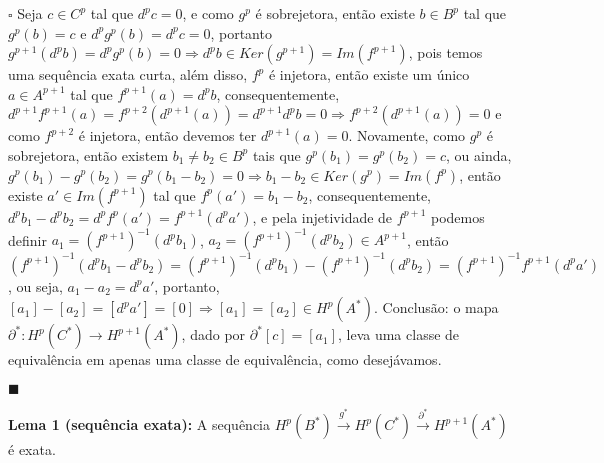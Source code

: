 \documentclass{article}
\begin{document}
	$\square$ Seja $c \in C^{p}$ tal que $d^{p}c=0$, e como $g^{p}$ é sobrejetora, então existe $b \in B^{p}$ tal que $g^{p}(b) = c$ e $d^{p}g^{p}(b) = d^{p}c = 0$, portanto $g^{p+1}(d^{p}b) = d^{p}g^{p}(b) = 0 \Rightarrow d^{p}b \in Ker(g^{p+1}) = Im(f^{p+1})$, pois temos uma sequência exata curta, além disso, $f^{p}$ é injetora, então existe um único $a \in A^{p+1}$ tal que $f^{p+1}(a) = d^{p}b$, consequentemente, $d^{p+1}f^{p+1}(a) = f^{p+2}(d^{p+1}(a))=d^{p+1}d^{p}b=0 \Rightarrow f^{p+2}(d^{p+1}(a)) =0$ e como $f^{p+2}$ é injetora, então devemos ter $d^{p+1}(a)=0$. Novamente, como $g^{p}$ é sobrejetora, então existem $b_{1} \neq b_{2} \in B^{p}$ tais que $g^{p}(b_{1}) = g^{p}(b_{2}) = c$, ou ainda, $g^{p}(b_{1}) - g^{p}(b_{2}) = g^{p}(b_{1}-b_{2}) = 0 \Rightarrow b_{1}-b_{2} \in Ker(g^{p}) = Im(f^{p})$, então existe $a' \in Im(f^{p+1})$ tal que $f^{p}(a') = b_{1}-b_{2}$, consequentemente, $d^{p}b_{1} - d^{p}b_{2} = d^{p}f^{p}(a') = f^{p+1}(d^{p}a')$, e pela injetividade de $f^{p+1}$ podemos definir $a_{1} = (f^{p+1})^{-1}(d^{p}b_{1})$, $ a_{2} = (f^{p+1})^{-1}(d^{p}b_{2}) \in A^{p+1}$, então $(f^{p+1})^{-1}(d^{p}b_{1} - d^{p}b_{2}) =(f^{p+1})^{-1}(d^{p}b_{1}) - (f^{p+1})^{-1}(d^{p}b_{2})  = (f^{p+1})^{-1}f^{p+1}(d^{p}a')$, ou seja, $a_{1} - a_{2} = d^{p}a'$, portanto, $[a_{1}] - [a_{2}] = [d^{p}a'] = [0] \Rightarrow [a_{1}] = [a_{2}] \in H^{p}(A^{*})$. Conclusão: o mapa $\partial^{*}: H^{p}(C^{*}) \to H^{p+1}(A^{*})$, dado por $\partial^{*}[c] = [a_{1}]$, leva uma classe de equivalência em apenas uma classe de equivalência, como desejávamos. 
	
	$\blacksquare$
	
	\vspace{2 mm}
	\textbf{Lema 1 (sequência exata):} A sequência $H^{p}(B^{*}) \xrightarrow{g^{*}} H^{p}(C^{*}) \xrightarrow{\partial^{*}} H^{p+1}(A^{*})$ é exata.
	
\end{document}
